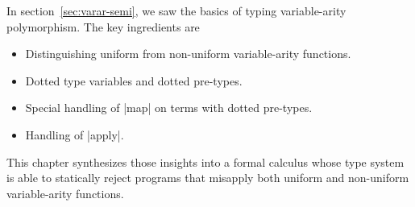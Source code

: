 \begin{schemeregion}
In section~\ref{sec:varar-semi}, we saw the basics of typing
variable-arity polymorphism.  The key ingredients are 
\begin{itemize}
\item Distinguishing uniform from non-uniform variable-arity functions.
\item Dotted type variables and dotted pre-types.
\item Special handling of \scheme|map| on terms with dotted pre-types.
\item Handling of \scheme|apply|.
\end{itemize}
\noindent
This chapter synthesizes those insights into a formal calculus whose
type system is able to statically reject programs that misapply
both uniform and non-uniform variable-arity functions.  
\end{schemeregion}
